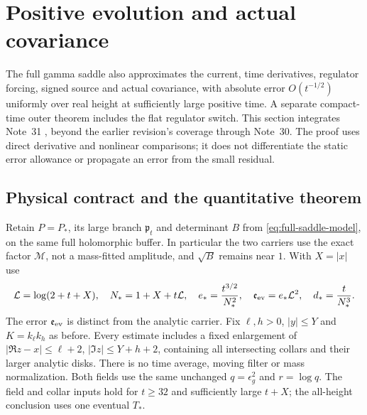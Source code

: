 \section{Positive evolution and actual covariance}\label{sec:positive-evolution}
The full gamma saddle also approximates the current, time derivatives,
regulator forcing, signed source and actual covariance, with absolute
error $O(t^{-1/2})$ uniformly over real height at sufficiently large
positive time. A separate compact-time outer theorem includes the flat
regulator switch. This section integrates Note~31 \cite{n31}, beyond
the earlier revision's coverage through Note~30. The proof uses direct
derivative and nonlinear comparisons; it does not differentiate the
static error allowance or propagate an error from the small residual.

\subsection{Physical contract and the quantitative theorem}
Retain $P=P_*$, its large branch $\mathfrak p_t$ and determinant $B$
from \eqref{eq:full-saddle-model}, on the same full holomorphic buffer.
In particular the two carriers use the exact factor $\mathcal M$, not
a mass-fitted amplitude, and $\sqrt B$ remains near $1$.
With $X=|x|$ use
\begin{equation}
 \mathcal L=\log(2+t+X),\quad N_*=1+X+t\mathcal L,\quad
 e_*=\frac{t^{3/2}}{N_*^2},\quad
 \mathfrak e_{\rm ev}=e_*\mathcal L^2,\quad d_*=\frac{t}{N_*^3}.
 \label{eq:positive-evolution-scales}
\end{equation}
The error $\mathfrak e_{\rm ev}$ is distinct from the analytic carrier.
Fix $\ell,h>0$, $|y|\le Y$ and $K=k_\ell k_h$ as before. Every
estimate includes a fixed enlargement of
$|\Re z-x|\le\ell+2$, $|\Im z|\le Y+h+2$, containing all
intersecting collars and their larger analytic disks. There is no time
average, moving filter or mass normalization. Both fields use the same
unchanged $q=\epsilon_g^2$ and $r=\log q$.
The field and collar inputs hold for $t\ge32$ and sufficiently large
$t+X$; the all-height conclusion uses one eventual $T_*$.


